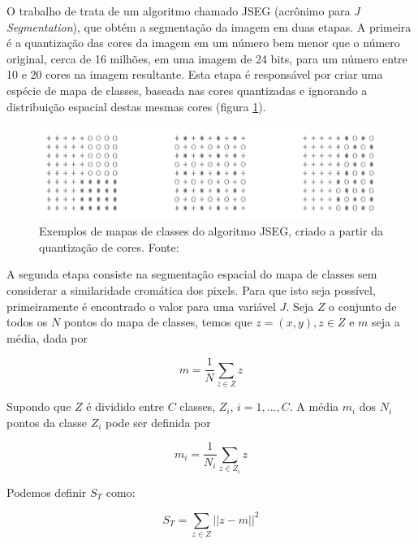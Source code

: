 
O trabalho de  trata de um algoritmo chamado JSEG (acrônimo para \textit{J Segmentation}), que obtém a segmentação da imagem em duas etapas. A primeira é a quantização das cores da imagem em um número bem menor que o número original, cerca de 16 milhões, em uma imagem de 24 bits, para um número entre 10 e 20 cores na imagem resultante. Esta etapa é responsável por criar uma espécie de mapa de classes, baseada nas cores quantizadas e ignorando a distribuição espacial destas mesmas cores (figura \ref{fig:jseg_classmap}).

\begin{figure}[h]
  \centering
  \includegraphics[scale=1]{imgs/jseg_classmap}
  \caption[Exemplos de mapas de classes do algoritmo JSEG]{Exemplos de mapas de classes do algoritmo JSEG, criado a partir da quantização de cores. Fonte: \cite{deng:2001}}
  \label{fig:jseg_classmap}
\end{figure}

A segunda etapa consiste na segmentação espacial do mapa de classes sem considerar a similaridade cromática dos pixels. Para que isto seja possível, primeiramente é encontrado o valor para uma variável $J$. Seja $Z$ o conjunto de todos os $N$ pontos do mapa de classes, temos que $z = (x,y), z \in Z$ e $m$ seja a média, dada por

\begin{equation}
	\displaystyle m = \frac{1}{N} \sum_{z \in Z} z
\end{equation}

Supondo que $Z$ é dividido entre $C$ classes, $Z_i$, $i = 1,...,C$. A média $m_i$ dos $N_i$ pontos da classe $Z_i$ pode ser definida por

\begin{equation}
	\displaystyle m_i = \frac{1}{N_i} \sum_{z \in Z_i} z
\end{equation}

Podemos definir $S_T$ como:

\begin{equation}
	\displaystyle S_T = \sum_{z \in Z} || z - m ||^2
\end{equation}

